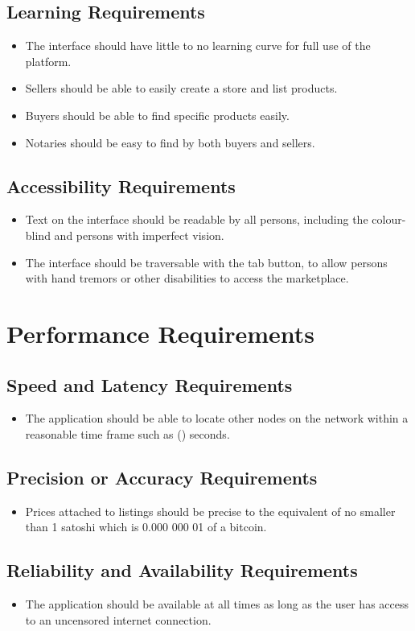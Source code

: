 \documentclass{article}
\begin{document}
\subsection{Learning Requirements}
\begin{itemize}
\item
The interface should have little to no learning curve for full use of the platform.
\item
Sellers should be able to easily create a store and list products.
\item
Buyers should be able to find specific products easily.
\item
Notaries should be easy to find by both buyers and sellers.
\end{itemize}
\subsection{Accessibility Requirements}
\begin{itemize}
\item
Text on the interface should be readable by all persons, including the colour-blind and persons with imperfect vision.
\item
The interface should be traversable with the tab button, to allow persons with hand tremors or other disabilities to access the marketplace.
\end{itemize}
\section{Performance Requirements}
\subsection{Speed and Latency Requirements}
\begin{itemize}
\item
The application should be able to locate other nodes on the network within a reasonable time frame such as () seconds.
\end{itemize}
\subsection{Precision or Accuracy Requirements}
\begin{itemize}
\item
Prices attached to listings should be precise to the equivalent of no smaller than 1 satoshi which is 0.000 000 01 of a bitcoin.
\end{itemize}
\subsection{Reliability and Availability Requirements}
\begin{itemize}
\item
The application should be available at all times as long as the user has access to an uncensored internet connection.
        
\end{itemize}
\end{document}
